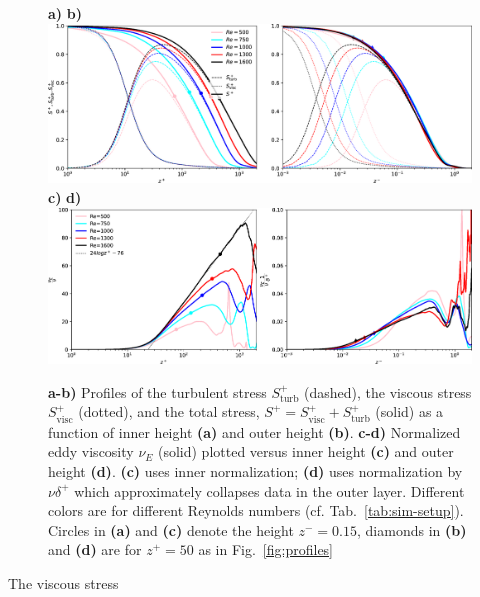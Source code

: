 \documentclass[smallcondensed,final]{svjour3}
\begin{document}
\begin{figure}
  \textbf{a)}\hspace{0.47\textwidth} \textbf{b)}\\
  \includegraphics[width=\textwidth]{Fig2ab.eps}\\  %
  \textbf{c)}\hspace{0.47\textwidth} \textbf{d)}\\    
  \includegraphics[width=\textwidth]{Fig2cd.eps}\\ %
  \caption{
    \textbf{a-b)} Profiles of
    the turbulent stress $S_\mathrm{turb}^+$ (dashed), 
    the viscous stress  $S_\mathrm{visc}^+$ (dotted), 
    and the total stress, $S^+=S_\mathrm{visc}^++S_\mathrm{turb}^+$ (solid)
    as a function of inner height \textbf{(a)} and outer height \textbf{(b)}. 
    \textbf{c-d)} Normalized eddy viscosity $\nu_E$ (solid) plotted versus
    inner height \textbf{(c)} and outer height \textbf{(d)}. \textbf{(c)} uses inner normalization; 
    \textbf{(d)} uses normalization by $\nu \delta^+$ which approximately collapses data in the 
    outer layer. 
    Different colors are for different Reynolds numbers (cf. Tab.~\ref{tab:sim-setup}).
    Circles in \textbf{(a)} and \textbf{(c)} denote the height
    $z^-=0.15$, diamonds in \textbf{(b)} and \textbf{(d)} are for $z^+=50$
    as in Fig.~\ref{fig:profiles}
    \label{fig:stresses}} 
\end{figure} 
The viscous stress
%
\end{document}
